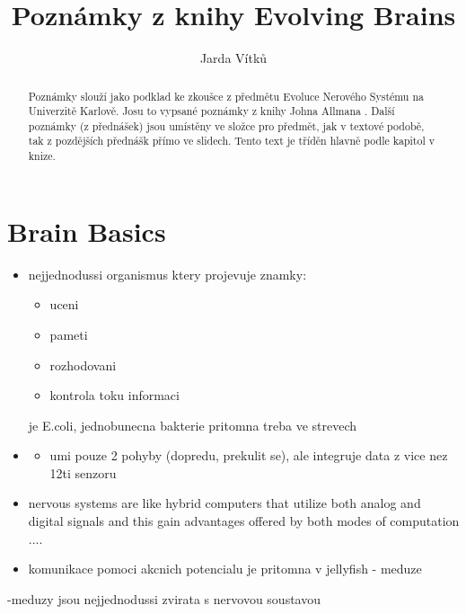 \documentclass[journal,onecolumn]{IEEEtrancz}
\begin{document}
\title{Poznámky z knihy Evolving Brains}
\author{Jarda Vítků}

\maketitle

\begin{abstract}
Poznámky slouží jako podklad ke zkoušce z předmětu Evoluce Nerového Systému na Univerzitě Karlově. Josu to vypsané poznámky z knihy Johna Allmana \cite{kniha}. Další poznámky (z přednášek) jsou umístěny ve složce pro předmět, jak v textové podobě, tak z pozdějších přednášk přímo ve slidech. Tento text je tříděn hlavně podle kapitol v knize. 
\end{abstract}

\IEEEpeerreviewmaketitle



\section{Brain Basics}


\begin{itemize}
	\item nejjednodussi organismus ktery projevuje znamky:
	\begin{itemize}
		\item uceni
		\item pameti
		\item rozhodovani
		\item kontrola toku informaci
			\vspace{3mm}
	\end{itemize}
	je E.coli, jednobunecna bakterie pritomna treba ve strevech
		\item 
\begin{itemize}
		\begin{itemize}
			\item umi pouze 2 pohyby (dopredu, prekulit se), ale integruje data z vice nez 12ti senzoru
				\vspace{3mm}
		\end{itemize}

	\end{itemize}

	\item nervous systems are like hybrid computers that utilize both analog and digital signals and this gain advantages offered by both modes of computation ....
		\vspace{3mm}
	\item komunikace pomoci akcnich potencialu je pritomna v jellyfish - meduze
\end{itemize}
 	-meduzy jsou nejjednodussi zvirata s nervovou soustavou
\end{document}
